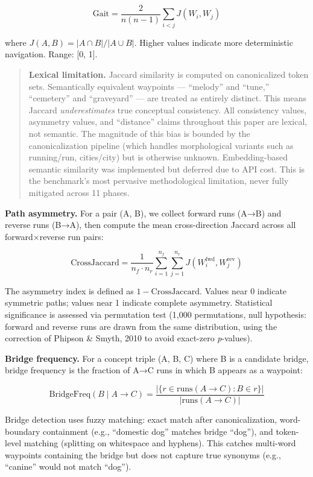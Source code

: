 \[\text{Gait} = \frac{2}{n(n-1)} \sum_{i < j} J(W_i, W_j)\]

where \(J(A, B) = |A \cap B| / |A \cup B|\). Higher values indicate more deterministic navigation. Range: {[}0, 1{]}.

\begin{quote}
\textbf{Lexical limitation.} Jaccard similarity is computed on canonicalized token sets. Semantically equivalent waypoints --- ``melody'' and ``tune,'' ``cemetery'' and ``graveyard'' --- are treated as entirely distinct. This means Jaccard \emph{underestimates} true conceptual consistency. All consistency values, asymmetry values, and ``distance'' claims throughout this paper are lexical, not semantic. The magnitude of this bias is bounded by the canonicalization pipeline (which handles morphological variants such as running/run, cities/city) but is otherwise unknown. Embedding-based semantic similarity was implemented but deferred due to API cost. This is the benchmark's most pervasive methodological limitation, never fully mitigated across 11 phases.
\end{quote}

\textbf{Path asymmetry.} For a pair (A, B), we collect forward runs (A→B) and reverse runs (B→A), then compute the mean cross-direction Jaccard across all forward×reverse run pairs:

\[\text{CrossJaccard} = \frac{1}{n_f \cdot n_r} \sum_{i=1}^{n_f} \sum_{j=1}^{n_r} J(W^{\text{fwd}}_i, W^{\text{rev}}_j)\]

The asymmetry index is defined as \(1 - \text{CrossJaccard}\). Values near 0 indicate symmetric paths; values near 1 indicate complete asymmetry. Statistical significance is assessed via permutation test (1,000 permutations, null hypothesis: forward and reverse runs are drawn from the same distribution, using the correction of Phipson \& Smyth, 2010 to avoid exact-zero \emph{p}-values).

\textbf{Bridge frequency.} For a concept triple (A, B, C) where B is a candidate bridge, bridge frequency is the fraction of A→C runs in which B appears as a waypoint:

\[\text{BridgeFreq}(B \mid A \to C) = \frac{|\{r \in \text{runs}(A \to C) : B \in r\}|}{|\text{runs}(A \to C)|}\]

Bridge detection uses fuzzy matching: exact match after canonicalization, word-boundary containment (e.g., ``domestic dog'' matches bridge ``dog''), and token-level matching (splitting on whitespace and hyphens). This catches multi-word waypoints containing the bridge but does not capture true synonyms (e.g., ``canine'' would not match ``dog'').

